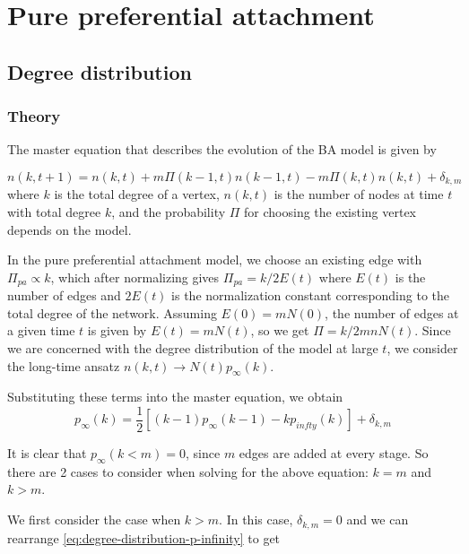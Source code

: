 \section{Pure preferential attachment}\label{section:pure-preferential-attachment}

\subsection{Degree distribution}\label{subsection:ppa-degree-distribution}
\subsubsection{Theory}
The master equation that describes the evolution of the BA model is given by

\begin{equation}
	n(k, t+1) = n(k, t) + m \Pi(k-1, t)n(k-1, t) - m \Pi(k, t)n(k, t) + \delta_{k,m}
	\label{eq:master}
\end{equation}
where $k$ is the total degree of a vertex, $n(k, t)$ is the number of nodes at time $t$ with total degree $k$, and the probability $\Pi$ for choosing the existing vertex depends on the model. 

In the pure preferential attachment model, we choose an existing edge with $\Pi_{pa} \propto k$, which after normalizing gives $\Pi_{pa} = k/ 2E(t)$ where $E(t)$ is the number of edges and $2E(t)$ is the normalization constant corresponding to the total degree of the network. Assuming $E(0) = mN(0)$, the number of edges at a given time $t$ is given by $E(t) = mN(t)$, so we get $\Pi = k / 2mnN(t)$. Since we are concerned with the degree distribution of the model at large $t$, we consider the long-time ansatz $n(k, t) \rightarrow N(t) p_{\infty}(k)$. 

Substituting these terms into the master equation, we obtain 
\begin{equation}
	p_{\infty}(k) = \frac{1}{2}[(k-1)p_{\infty}(k-1) - kp_{infty}(k)] + \delta_{k,m}
	\label{eq:degree-distribution-p-infinity}
\end{equation}

It is clear that $p_{\infty}(k < m) = 0$, since $m$ edges are added at every stage. So there are 2 cases to consider when solving for the above equation: $k = m$ and $k > m$. 

We first consider the case when $k > m$. In this case, $\delta_{k,m} = 0$ and we can rearrange \autoref{eq:degree-distribution-p-infinity} to get

